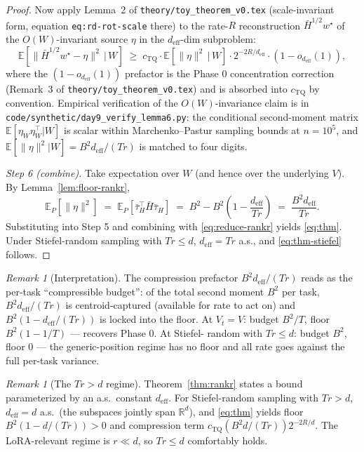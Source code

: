 \documentclass{article}
\theoremstyle{remark}
\newtheorem{remark}[theorem]{Remark}
\newcommand{\R}{\mathbb{R}}
\newcommand{\E}{\mathbb{E}}
\newcommand{\deff}{d_{\mathrm{eff}}}
\newcommand{\tauH}{\bar\tau_{H}}
\begin{document}
\begin{proof}
Now apply Lemma~2 of \texttt{theory/toy\_theorem\_v0.tex}
(scale-invariant form, equation \texttt{eq:rd-rot-scale} there) to
the rate-$R$ reconstruction $\bar H^{1/2}w^\star$ of the
$O(W)$-invariant source $\eta$ in the $\deff$-dim subproblem:
\[
  \E\!\left[\|\bar H^{1/2}w^\star - \eta\|^2 \,\big|\, W\right]
  \;\geq\;
  c_{\mathrm{TQ}}\cdot\E\!\left[\|\eta\|^2\,\big|\,W\right]
  \cdot 2^{-2R/\deff}\cdot(1 - o_{\deff}(1)),
\]
where the $(1-o_{\deff}(1))$ prefactor is the Phase 0 concentration
correction (Remark~3 of \texttt{theory/toy\_theorem\_v0.tex}) and is
absorbed into $c_{\mathrm{TQ}}$ by convention. Empirical verification
of the $O(W)$-invariance claim is in
\texttt{code/synthetic/day9\_verify\_lemma6.py}: the conditional
second-moment matrix $\E[\eta_W\eta_W^\top|W]$ is scalar within
Marchenko--Pastur sampling bounds at $n=10^5$, and
$\E[\|\eta\|^2|W] = B^2\deff/(Tr)$ is matched to four digits.

\emph{Step 6 (combine).} Take expectation over $W$ (and hence over the
underlying $V$). By Lemma~\ref{lem:floor-rankr},
\[
  \E_P[\|\eta\|^2]
  \;=\; \E_P[\tauH^\top\bar H\tauH]
  \;=\; B^2 - B^2\!\left(1-\frac{\deff}{Tr}\right)
  \;=\; \frac{B^2\deff}{Tr}.
\]
Substituting into Step 5 and combining with \eqref{eq:reduce-rankr}
yields \eqref{eq:thm}. Under Stiefel-random sampling with $Tr\leq d$,
$\deff = Tr$ a.s., and \eqref{eq:thm-stiefel} follows.
\end{proof}

\begin{remark}[Interpretation]
The compression prefactor $B^2\deff/(Tr)$ reads as the per-task
``compressible budget'': of the total second moment $B^2$ per task,
$B^2\deff/(Tr)$ is centroid-captured (available for rate to act on)
and $B^2(1-\deff/(Tr))$ is locked into the floor. At $V_t=V$:
budget $B^2/T$, floor $B^2(1-1/T)$ — recovers Phase 0. At Stiefel-
random with $Tr\leq d$: budget $B^2$, floor $0$ — the generic-position
regime has no floor and all rate goes against the full per-task
variance.
\end{remark}

\begin{remark}[The $Tr > d$ regime]
Theorem~\ref{thm:rankr} states a bound parameterized by an a.s.\
constant $\deff$. For Stiefel-random sampling with $Tr > d$, $\deff =
d$ a.s.\ (the subspaces jointly span $\R^d$), and \eqref{eq:thm}
yields floor $B^2(1-d/(Tr)) > 0$ and compression term
$c_{\mathrm{TQ}} (B^2 d/(Tr)) 2^{-2R/d}$. The LoRA-relevant regime is
$r\ll d$, so $Tr\leq d$ comfortably holds.
\end{remark}
\end{document}
